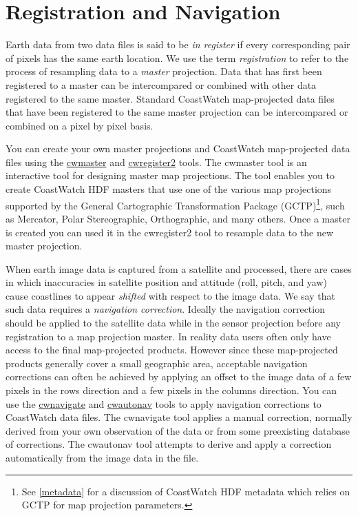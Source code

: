 \section{Registration and Navigation}
\label{registration}

Earth data from two data files is said to be {\em in register} if
every corresponding pair of pixels has the same earth location.  We
use the term {\em registration} to refer to the process of resampling
data to a {\em master} projection.  Data that has first been
registered to a master can be intercompared or combined with
other data registered to the same master.  Standard CoastWatch
map-projected data files that have been registered to the same master
projection can be intercompared or combined on a pixel by pixel basis.

You can create your own master projections and CoastWatch map-projected
data files using the \hyperlink{cwmaster}{cwmaster} and
\hyperlink{cwregister2}{cwregister2} tools.  The cwmaster tool is an
interactive tool for designing master map projections.  The tool
enables you to create CoastWatch HDF masters that use one of the
various map projections supported by the General Cartographic
Transformation Package (GCTP)\footnote{See \autoref{metadata} for
a discussion of CoastWatch HDF metadata which relies on GCTP for
map projection parameters.}, such as Mercator, Polar Stereographic,
Orthographic, and many others.  Once a master is created 
you can used it in the cwregister2 tool to resample data to the new
master projection.

When earth image data is captured from a satellite and processed,
there are cases in which inaccuracies in satellite position and
attitude (roll, pitch, and yaw) cause coastlines to appear {\em
shifted} with respect to the image data.  We say that such data
requires a {\em navigation correction}.  Ideally the navigation
correction should be applied to the satellite data while in the
sensor projection before any registration to a map projection master.
In reality data users often only have access to the final map-projected
products.  However since these map-projected products generally
cover a small geographic area, acceptable navigation corrections
can often be achieved by applying an offset to the image data of a
few pixels in the rows direction and a few pixels in the columns
direction.  You can use the \hyperlink{cwnavigate}{cwnavigate} and
\hyperlink{cwautonav}{cwautonav} tools to apply navigation corrections
to CoastWatch data files.  The cwnavigate tool applies a manual
correction, normally derived from your own observation of the data
or from some preexisting database of corrections.  The cwautonav
tool attempts to derive and apply a correction automatically from
the image data in the file.

